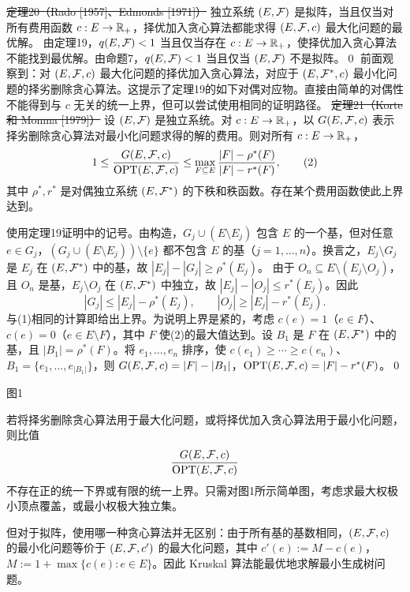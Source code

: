 \st{定理20（Rado [1957]、Edmonds [1971]）} 独立系统 $(E,\mathcal F)$ 是拟阵，当且仅当对所有费用函数 $c:E\to\mathbb R_+$，择优加入贪心算法都能求得 $(E,\mathcal F,c)$ 最大化问题的最优解。
\pr 由定理19，$q(E,\mathcal F)<1$ 当且仅当存在 $c:E\to\mathbb R_+$，使择优加入贪心算法不能找到最优解。由命题7，$q(E,\mathcal F)<1$ 当且仅当 $(E,\mathcal F)$ 不是拟阵。\qed
前面观察到：对 $(E,\mathcal F,c)$ 最大化问题的择优加入贪心算法，对应于 $(E,\mathcal F^*,c)$ 最小化问题的择劣删除贪心算法。这提示了定理19的如下对偶对应物。直接由简单的对偶性不能得到与 $c$ 无关的统一上界，但可以尝试使用相同的证明路径。
\st{定理21（Korte 和 Monma [1979]）} 设 $(E,\mathcal F)$ 是独立系统。对 $c:E\to\mathbb R_+$，以 $G(E,\mathcal F,c)$ 表示择劣删除贪心算法对最小化问题求得的解的费用。则对所有 $c:E\to\mathbb R_+$，
\[1\le\frac{G(E,\mathcal F,c)}{\operatorname{OPT}(E,\mathcal F,c)}
\le\max_{F\subseteq E}\frac{|F|-\rho^*(F)}{|F|-r^*(F)},\tag{2}\]
其中 $\rho^*,r^*$ 是对偶独立系统 $(E,\mathcal F^*)$ 的下秩和秩函数。存在某个费用函数使此上界达到。

\pr 使用定理19证明中的记号。由构造，$G_j\cup(E\setminus E_j)$ 包含 $E$ 的一个基，但对任意 $e\in G_j$，$(G_j\cup(E\setminus E_j))\setminus\{e\}$ 都不包含 $E$ 的基（$j=1,\ldots,n$）。换言之，$E_j\setminus G_j$ 是 $E_j$ 在 $(E,\mathcal F^*)$ 中的基，故 $|E_j|-|G_j|\ge\rho^*(E_j)$。
由于 $O_n\subseteq E\setminus(E_j\setminus O_j)$，且 $O_n$ 是基，$E_j\setminus O_j$ 在 $(E,\mathcal F^*)$ 中独立，故 $|E_j|-|O_j|\le r^*(E_j)$。因此
\[|G_j|\le|E_j|-\rho^*(E_j),\qquad |O_j|\ge|E_j|-r^*(E_j).\]
与(1)相同的计算即给出上界。为说明上界是紧的，考虑 $c(e)=1$（$e\in F$）、$c(e)=0$（$e\in E\setminus F$），其中 $F$ 使(2)的最大值达到。设 $B_1$ 是 $F$ 在 $(E,\mathcal F^*)$ 中的基，且 $|B_1|=\rho^*(F)$。将 $e_1,\ldots,e_n$ 排序，使 $c(e_1)\ge\cdots\ge c(e_n)$、$B_1=\{e_1,\ldots,e_{|B_1|}\}$，则 $G(E,\mathcal F,c)=|F|-|B_1|$，$\operatorname{OPT}(E,\mathcal F,c)=|F|-r^*(F)$。\qed
\begin{center}
\par\small 图1
\end{center}
若将择劣删除贪心算法用于最大化问题，或将择优加入贪心算法用于最小化问题，则比值
\[\frac{G(E,\mathcal F,c)}{\operatorname{OPT}(E,\mathcal F,c)}\]
不存在正的统一下界或有限的统一上界。只需对图1所示简单图，考虑求最大权极小顶点覆盖，或最小权极大独立集。

但对于拟阵，使用哪一种贪心算法并无区别：由于所有基的基数相同，$(E,\mathcal F,c)$ 的最小化问题等价于 $(E,\mathcal F,c')$ 的最大化问题，其中 $c'(e):=M-c(e)$，$M:=1+\max\{c(e):e\in E\}$。因此 Kruskal 算法能最优地求解最小生成树问题。

